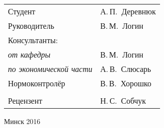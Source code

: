 \begin{titlepage}
\begin{center}
    \begin{tabular}{ p{}p{} }
      Студент & А.\,П.~Деревнюк \\
      Руководитель & В.\,М.~Логин \\
      Консультанты: &\\
      \hspace*{3ex}\emph{от кафедры} & В.\,М.~Логин \\
      \hspace*{3ex}\emph{по экономической части} & А.\,В.~Слюсарь \\
      Нормоконтролёр & В.\,В.~Хорошко \\
      & \\
      Рецензент & Н.\,С.~Собчук \\
    \end{tabular}

    \vfill
    {\normalsize Минск 2016}
  \end{center}
\end{titlepage}
